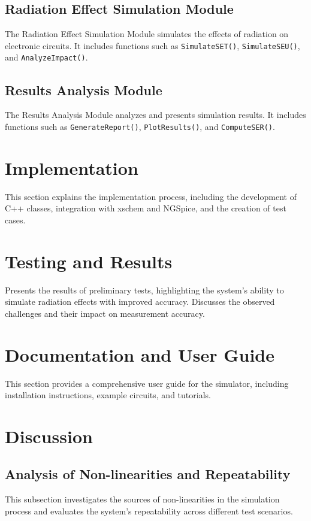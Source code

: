 \documentclass[conference]{IEEEtran}
\begin{document}
\subsection{Radiation Effect Simulation Module}
The Radiation Effect Simulation Module simulates the effects of radiation on electronic circuits. It includes functions such as \texttt{SimulateSET()}, \texttt{SimulateSEU()}, and \texttt{AnalyzeImpact()}.

\subsection{Results Analysis Module}
The Results Analysis Module analyzes and presents simulation results. It includes functions such as \texttt{GenerateReport()}, \texttt{PlotResults()}, and \texttt{ComputeSER()}.

\section{Implementation}
This section explains the implementation process, including the development of C++ classes, integration with xschem and NGSpice, and the creation of test cases.

\section{Testing and Results}
Presents the results of preliminary tests, highlighting the system's ability to simulate radiation effects with improved accuracy. Discusses the observed challenges and their impact on measurement accuracy.

\section{Documentation and User Guide}
This section provides a comprehensive user guide for the simulator, including installation instructions, example circuits, and tutorials.

\section{Discussion}
\subsection{Analysis of Non-linearities and Repeatability}
This subsection investigates the sources of non-linearities in the simulation process and evaluates the system's repeatability across different test scenarios.
\end{document}
